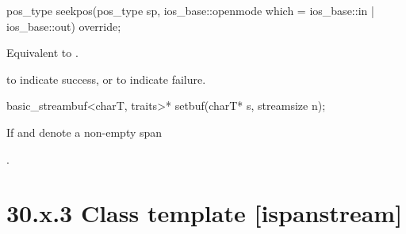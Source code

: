 \documentclass[ebook,11pt,article]{memoir}
\begin{document}
\begin{itemdecl}
pos_type seekpos(pos_type sp,
                 ios_base::openmode which
                   = ios_base::in | ios_base::out) override;
\end{itemdecl}

\begin{itemdescr}
\pnum
\effects
Equivalent to .

\pnum
\returns
{}
to indicate success, or
to indicate failure.
\end{itemdescr}

\begin{itemdecl}
basic_streambuf<charT, traits>* setbuf(charT* s, streamsize n);
\end{itemdecl}

\begin{itemdescr}
\pnum
\effects
If  and  denote a non-empty span

\pnum
\returns
{}.
\end{itemdescr}

\section{30.x.3 Class template  [ispanstream] }
\end{document}
